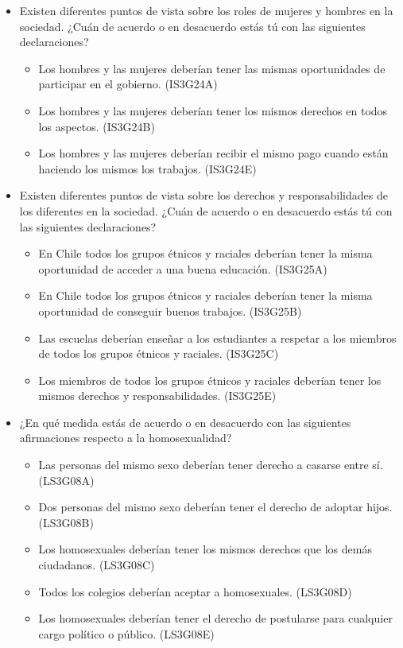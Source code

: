\documentclass[12pt,twoside]{templates/facsothesis}
\providecommand{\tightlist}{%
  \setlength{\itemsep}{0pt}\setlength{\parskip}{0pt}}
\begin{document}
\begin{itemize}
\item
  Existen diferentes puntos de vista sobre los roles de mujeres y hombres en la sociedad. ¿Cuán de acuerdo o en desacuerdo estás tú con las siguientes declaraciones?

  \begin{itemize}
  \tightlist
  \item
    Los hombres y las mujeres deberían tener las mismas oportunidades de participar en el gobierno. (IS3G24A)
  \item
    Los hombres y las mujeres deberían tener los mismos derechos en todos los aspectos. (IS3G24B)
  \item
    Los hombres y las mujeres deberían recibir el mismo pago cuando están haciendo los mismos los trabajos. (IS3G24E)
  \end{itemize}
\item
  Existen diferentes puntos de vista sobre los derechos y responsabilidades de los diferentes en la sociedad. ¿Cuán de acuerdo o en desacuerdo estás tú con las siguientes declaraciones?

  \begin{itemize}
  \tightlist
  \item
    En Chile todos los grupos étnicos y raciales deberían tener la misma oportunidad de acceder a una buena educación. (IS3G25A)
  \item
    En Chile todos los grupos étnicos y raciales deberían tener la misma oportunidad de conseguir buenos trabajos. (IS3G25B)
  \item
    Las escuelas deberían enseñar a los estudiantes a respetar a los miembros de todos los grupos étnicos y raciales. (IS3G25C)
  \item
    Los miembros de todos los grupos étnicos y raciales deberían tener los mismos derechos y responsabilidades. (IS3G25E)
  \end{itemize}
\item
  ¿En qué medida estás de acuerdo o en desacuerdo con las siguientes afirmaciones respecto a la homosexualidad?

  \begin{itemize}
  \tightlist
  \item
    Las personas del mismo sexo deberían tener derecho a casarse entre sí. (LS3G08A)
  \item
    Dos personas del mismo sexo deberían tener el derecho de adoptar hijos. (LS3G08B)
  \item
    Los homosexuales deberían tener los mismos derechos que los demás ciudadanos. (LS3G08C)
  \item
    Todos los colegios deberían aceptar a homosexuales. (LS3G08D)
  \item
    Los homosexuales deberían tener el derecho de postularse para cualquier cargo político o público. (LS3G08E)
  \end{itemize}
\end{itemize}
\end{document}
